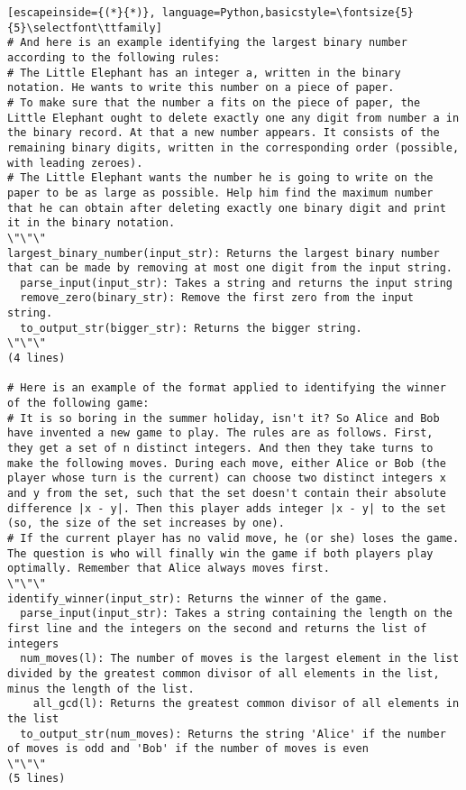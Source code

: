 \begin{figure*}[h]
\begin{lstlisting}[escapeinside={(*}{*)}, language=Python,basicstyle=\fontsize{5}{5}\selectfont\ttfamily]
# And here is an example identifying the largest binary number according to the following rules:
# The Little Elephant has an integer a, written in the binary notation. He wants to write this number on a piece of paper.
# To make sure that the number a fits on the piece of paper, the Little Elephant ought to delete exactly one any digit from number a in the binary record. At that a new number appears. It consists of the remaining binary digits, written in the corresponding order (possible, with leading zeroes).
# The Little Elephant wants the number he is going to write on the paper to be as large as possible. Help him find the maximum number that he can obtain after deleting exactly one binary digit and print it in the binary notation.
\"\"\"
largest_binary_number(input_str): Returns the largest binary number that can be made by removing at most one digit from the input string.
  parse_input(input_str): Takes a string and returns the input string
  remove_zero(binary_str): Remove the first zero from the input string.
  to_output_str(bigger_str): Returns the bigger string.
\"\"\"
(4 lines)

# Here is an example of the format applied to identifying the winner of the following game:
# It is so boring in the summer holiday, isn't it? So Alice and Bob have invented a new game to play. The rules are as follows. First, they get a set of n distinct integers. And then they take turns to make the following moves. During each move, either Alice or Bob (the player whose turn is the current) can choose two distinct integers x and y from the set, such that the set doesn't contain their absolute difference |x - y|. Then this player adds integer |x - y| to the set (so, the size of the set increases by one).
# If the current player has no valid move, he (or she) loses the game. The question is who will finally win the game if both players play optimally. Remember that Alice always moves first.
\"\"\"
identify_winner(input_str): Returns the winner of the game.
  parse_input(input_str): Takes a string containing the length on the first line and the integers on the second and returns the list of integers
  num_moves(l): The number of moves is the largest element in the list divided by the greatest common divisor of all elements in the list, minus the length of the list.
    all_gcd(l): Returns the greatest common divisor of all elements in the list
  to_output_str(num_moves): Returns the string 'Alice' if the number of moves is odd and 'Bob' if the number of moves is even
\"\"\"
(5 lines)


\end{lstlisting}
\end{figure*}

